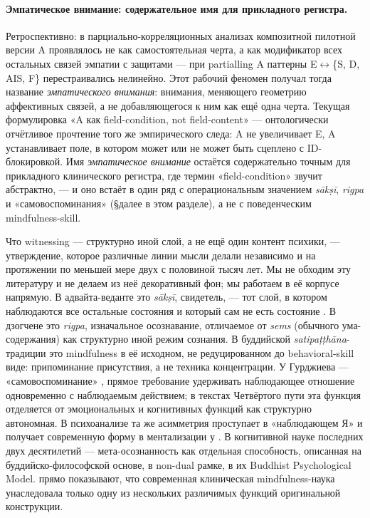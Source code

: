 \paragraph{Эмпатическое внимание: содержательное имя для прикладного регистра.} Ретроспективно: в парциально-корреляционных анализах композитной пилотной версии A проявлялось не как самостоятельная черта, а как модификатор всех остальных связей эмпатии с защитами --- при partialling A паттерны E$\leftrightarrow$\{S, D, AIS, F\} перестраивались нелинейно. Этот рабочий феномен получал тогда название \emph{эмпатического внимания}: внимания, меняющего геометрию аффективных связей, а не добавляющегося к ним как ещё одна черта. Текущая формулировка «A как field-condition, not field-content» --- онтологически отчётливое прочтение того же эмпирического следа: A не увеличивает E, A устанавливает поле, в котором \EAF{} может или не может быть сцеплено с ID-блокировкой. Имя \emph{эмпатическое внимание} остаётся содержательно точным для прикладного клинического регистра, где термин «field-condition» звучит абстрактно, --- и оно встаёт в один ряд с операциональным значением \textit{sākṣī}, \textit{rigpa} и «самовоспоминания» (§далее в этом разделе), а не с поведенческим mindfulness-skill.

Что witnessing --- структурно иной слой, а не ещё один контент психики, --- утверждение, которое различные линии мысли делали независимо и на протяжении по меньшей мере двух с половиной тысяч лет. Мы не обходим эту литературу и не делаем из неё декоративный фон; мы работаем в её корпусе напрямую. В адвайта-веданте это \textit{sākṣī}, свидетель, --- тот слой, в котором наблюдаются все остальные состояния и который сам не есть состояние \citep[через][]{godman1985, nisargadatta1973}. В дзогчене это \textit{rigpa}, изначальное осознавание, отличаемое от \textit{sems} (обычного ума-содержания) как структурно иной режим сознания. В буддийской \textit{satipaṭṭhāna}-традиции это mindfulness в её исходном, не редуцированном до behavioral-skill виде: припоминание присутствия, а не техника концентрации. У Гурджиева --- «самовоспоминание» \citep[через][]{ouspensky1949}, прямое требование удерживать наблюдающее отношение одновременно с наблюдаемым действием; в текстах Четвёртого пути эта функция отделяется от эмоциональных и когнитивных функций как структурно автономная. В психоанализе та же асимметрия проступает в «наблюдающем Я» \citep{sterba1934, kris1956} и получает современную форму в ментализации у \citet{fonagy2002}. В когнитивной науке последних двух десятилетий --- мета-осознанность как отдельная способность, описанная \citet{dunne2011} на буддийско-философской основе, \citet{josipovic2014} в non-dual рамке, \citet{grabovac2011} в их Buddhist Psychological Model. \citet{lutz2008} прямо показывают, что современная клиническая mindfulness-наука унаследовала только одну из нескольких различимых функций оригинальной конструкции.

